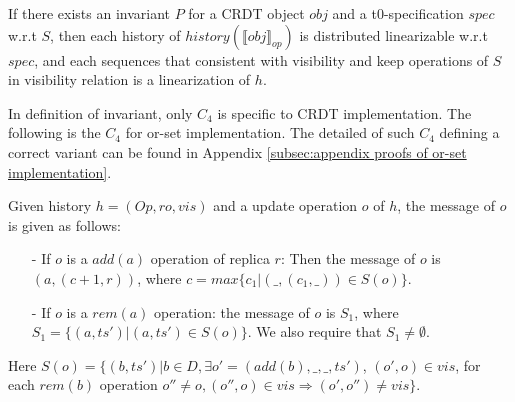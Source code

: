 \begin{lemma}
\label{lemma:invariant of operation-based CRDT implies distributed linearizability}
If there exists an invariant $P$ for a CRDT object $\mathit{obj}$ and a t0-specification $\mathit{spec}$ w.r.t $S$, then each history of $\mathit{history}(\llbracket \mathit{obj} \rrbracket_{\mathit{op}})$ is distributed linearizable w.r.t $\mathit{spec}$, and each sequences that consistent with visibility and keep operations of $S$ in visibility relation is a linearization of $h$.  
\end{lemma}

In definition of invariant, only $C_4$ is specific to CRDT implementation. The following is the $C_4$ for or-set implementation. The detailed of such $C_4$ defining a correct variant can be found in Appendix \ref{subsec:appendix proofs of or-set implementation}.

\begin{example}
\label{example:c4 for or-set implementation}

Given history $h = (\mathit{Op},\mathit{ro},\mathit{vis})$ and a update operation $o$ of $h$, the message of $o$ is given as follows: 

\begin{itemize}
\setlength{\itemsep}{0.5pt}
\item[-] If $o$ is a $\mathit{add}(a)$ operation of replica $r$:  Then the message of $o$ is $(a,(c+1,r))$, where $c = \mathit{max}\{ c_1 \vert (\_,(c_1,\_)) \in S(o) \}$. 

\item[-] If $o$ is a $\mathit{rem}(a)$ operation: the message of $o$ is $S_1$, where $S_1 = \{ (a,\mathit{ts}') \vert (a,\mathit{ts}') \in S(o) \}$. We also require that $S_1 \neq \emptyset$. 
\end{itemize} 
Here $S(o) = \{ (b,\mathit{ts}') \vert b \in D, \exists o' = (\mathit{add}(b),\_,\_,\mathit{ts}')$, $(o',o) \in \mathit{vis}$, for each $\mathit{rem}(b)$ operation $o'' \neq o, (o'',o) \in \mathit{vis} \Rightarrow (o',o'') \neq \mathit{vis} \}$.
\end{example}













